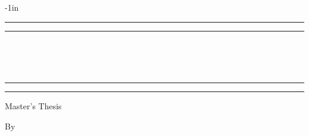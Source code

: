 
\begin{titlepage} %

\begin{adjustwidth*}{}{-1in}

	\centering %
	
	\scshape %
	
	\vspace*{\baselineskip} %
	
	
	\rule{\textwidth}{1.6pt}\vspace*{-\baselineskip}\vspace*{2pt} %
	\rule{\textwidth}{0.4pt} %
	
	\vspace{0.75\baselineskip} %
	
	{\LARGE \textsc{\titleen}\\\\\vspace{0.3cm}\titlede\\} %
	
	\vspace{0.75\baselineskip} %
	
	\rule{\textwidth}{0.4pt}\vspace*{-\baselineskip}\vspace{3.2pt} %
	\rule{\textwidth}{1.6pt} %
	
	\vspace{2\baselineskip} %
	
	Master's Thesis %

	\vspace*{3\baselineskip} %
	
	
	By

	\vspace{0.5\baselineskip} %
	

\end{adjustwidth*}
\end{titlepage}
